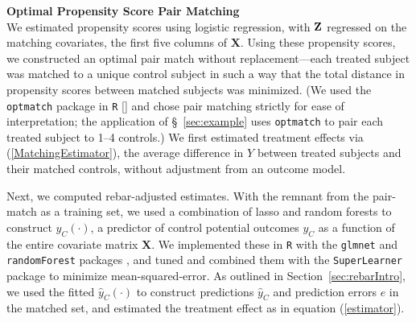 \documentclass[12pt]{article}\usepackage[]{graphicx}\usepackage[]{color}
\newcommand{\yhat}{\hat{y}_C}
\newcommand{\algorithm}{\hat{y}_C(\cdot)}
\newcommand{\covMat}{\bm{X}}
\begin{document}
\textbf{Optimal Propensity Score Pair Matching}\\
We estimated propensity scores using logistic regression, with $\bf{Z}$ regressed on the matching covariates, the first five columns of $\covMat$.
Using these propensity scores, we constructed an optimal pair match
without replacement---each treated subject was matched to a unique
control subject in such a way that the total distance in propensity
scores between matched subjects was minimized. (We used the \texttt{optmatch} package in \texttt{R}
[\citealt{hansen2007optmatch}] and chose pair matching strictly for
ease of interpretation; %
the application of \S~\ref{sec:example} uses \texttt{optmatch} to pair
each treated subject to 1--4 controls.)
We first estimated treatment effects via (\ref{MatchingEstimator}), the
average difference in $Y$ between treated subjects and their matched
controls, without adjustment from an outcome model.

Next, we computed rebar-adjusted estimates.
With the remnant from the pair-match as a training set,  we used a
combination of lasso \citep{tibshirani1996regression} and random forests
\citep{breiman2001random} to construct $\algorithm$, a predictor of control
potential outcomes $y_C$ as a function of the entire covariate matrix $\covMat$.
We implemented these in \texttt{R} with the
\texttt{glmnet} and \texttt{randomForest} packages
\citep{glmnet,rfCite}, and tuned and combined them with the
\texttt{SuperLearner} package \citep{superlearner} to minimize
mean-squared-error.
As outlined in Section~\ref{sec:rebarIntro}, we used the fitted
$\algorithm$ to construct predictions $\yhat$ and prediction errors
$e$ in the matched set, and estimated the treatment effect as in
equation (\ref{estimator}).
\end{document}
